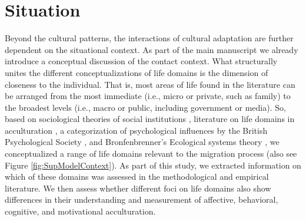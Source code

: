 \documentclass[man, 12pt, a4paper]{apa7}
\begin{document}
\section{Situation} 
Beyond the cultural patterns, the interactions of cultural adaptation are further dependent on the situational context. As part of the main manuscript we already introduce a conceptual discussion of the contact context. What structurally unites the different conceptualizations of life domains is the dimension of closeness to the individual. That is, most areas of life found in the literature can be arranged from the most immediate (i.e., micro or private, such as family) to the broadest levels (i.e., macro or public, including government or media). So, based on sociological theories of social institutions \citep{Durkheim1982}, literature on life domains in acculturation \citep{Arends-Toth2006, Arends-Toth2007, Zane2004}, a categorization of psychological influences by the British Psychological Society \citep{Michie2005a}, and Bronfenbrenner's Ecological systems theory \citep{Bronfenbrenner1992}, we conceptualized a range of life domains relevant to the migration process (also see Figure \ref{fig:SupModelContext}). As part of this study, we extracted information on which of these domains was assessed in the methodological and empirical literature. We then assess whether different foci on life domains also show differences in their understanding and measurement of affective, behavioral, cognitive, and motivational acculturation.
\end{document}
